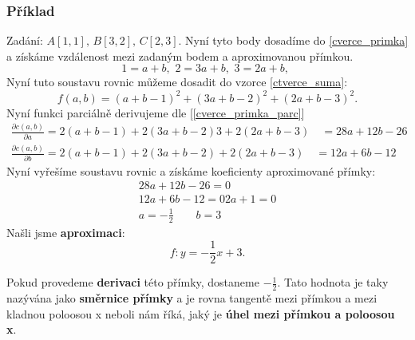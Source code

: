 \subsubsection*{Příklad}
Zadání: $A[1,1], \, B[3,2], \, C[2,3].$ Nyní tyto body dosadíme do \eqref{cverce_primka} a získáme vzdálenost mezi zadaným bodem a aproximovanou přímkou.
\begin{equation*}  
1 = a + b,\,\, 2 = 3a + b,\,\, 3 = 2a + b, \,\,
\end{equation*}
Nyní tuto soustavu rovnic můžeme dosadit do vzorce \eqref{ctverce_suma}:
\begin{equation*}  
f(a,b) = (a + b - 1)^2 + (3a + b - 2)^2 + (2a + b - 3)^2.
\end{equation*}
Nyní funkci parciálně derivujeme dle [\ref{cverce_primka_parc}]
\begin{equation*}  
\begin{array}{c}
\frac{\partial c(a,b)}{\partial a} =  2(a + b - 1) + 2(3a + b - 2)3 + 2(2a + b - 3) \quad = 28a + 12b - 26 \\
\frac{\partial c(a,b)}{\partial b} =  2(a + b - 1) + 2(3a + b - 2) + 2(2a + b - 3)  \quad = 12a + 6b - 12
\end{array}
\end{equation*}
Nyní vyřešíme soustavu rovnic a získáme koeficienty aproximované přímky:
\begin{equation*}  
\begin{array}{c}
28a + 12b - 26 = 0 \\
12a + 6b - 12 = 0
2a+1 = 0 \\
a = - \frac{1}{2} \quad \quad b = 3
\end{array}
\end{equation*}
Našli jsme \textbf{aproximaci}:
\begin{equation*}  
f : y = - \frac{1}{2} x + 3.
\end{equation*}

Pokud provedeme \textbf{derivaci} této přímky, dostaneme  $-\frac{1}{2}$. Tato hodnota je taky nazývána jako \textbf{směrnice přímky} a je rovna tangentě mezi přímkou a mezi kladnou poloosou x neboli nám říká, jaký je \textbf{úhel mezi přímkou a poloosou x}. 

